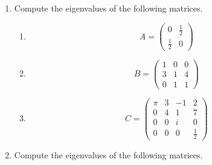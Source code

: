 \begin{enumerate}
\item Compute the eigenvalues of the following matrices.
\begin{enumerate}
	\item $$ A= 
	\begin{pmatrix}
	0&\frac{1}{2}\\
	\frac{1}{2}&0
	\end{pmatrix}
	$$
	\item
	$$ B=
	\begin{pmatrix}
	1&0&0\\
	3&1&4\\
	0&1&1
	\end{pmatrix}
	$$
	\item $$C=
	\begin{pmatrix}
	\pi& 3& -1& 2\\
	0 & 4& 1  & 7\\
	0 & 0& i  & 0\\
	0 & 0& 0  & \frac{1}{2}
	\end{pmatrix}
	$$
	
\end{enumerate}
\item Compute the eigenvalues of the following matrices.


\end{enumerate}
